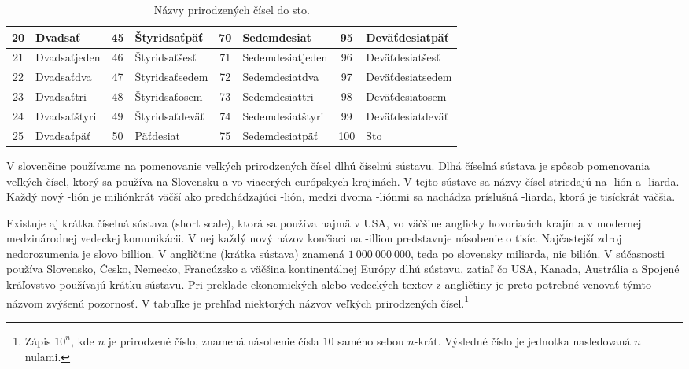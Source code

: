 \documentclass{report}
\begin{document}
\begin{table}[H]
\begin{tabular}{|cl|cl|cl|cl|}
    \hline
    20 & Dvadsať & 45 & Štyridsaťpäť & 70 & Sedemdesiat & 95 & Deväťdesiatpäť \\
    \hline
    21 & Dvadsaťjeden & 46 & Štyridsaťšesť & 71 & Sedemdesiatjeden & 96 & Deväťdesiatšesť \\
    \hline
    22 & Dvadsaťdva & 47 & Štyridsaťsedem & 72 & Sedemdesiatdva & 97 & Deväťdesiatsedem \\
    \hline
    23 & Dvadsaťtri & 48 & Štyridsaťosem & 73 & Sedemdesiattri & 98 & Deväťdesiatosem \\
    \hline
    24 & Dvadsaťštyri & 49 & Štyridsaťdeväť & 74 & Sedemdesiatštyri & 99 & Deväťdesiatdeväť \\
    \hline
    25 & Dvadsaťpäť & 50 & Päťdesiat & 75 & Sedemdesiatpäť & 100 & Sto \\
    \hline
  \end{tabular}
  \caption{Názvy prirodzených čísel do sto.}
\end{table}

V slovenčine používame na pomenovanie veľkých prirodzených čísel dlhú číselnú sústavu. Dlhá číselná sústava je spôsob pomenovania veľkých čísel, ktorý sa používa na Slovensku a vo viacerých európskych krajinách. V tejto sústave sa názvy čísel striedajú na -lión a -liarda. Každý nový -lión je miliónkrát väčší ako predchádzajúci -lión, medzi dvoma -liónmi sa nachádza príslušná -liarda, ktorá je tisíckrát väčšia.

Existuje aj krátka číselná sústava (short scale), ktorá sa používa najmä v USA, vo väčšine anglicky hovoriacich krajín a v modernej medzinárodnej vedeckej komunikácii. V nej každý nový názov končiaci na -illion predstavuje násobenie o tisíc. Najčastejší zdroj nedorozumenia je slovo billion. V angličtine (krátka sústava) znamená \(1\ 000\ 000\ 000\), teda po slovensky miliarda, nie bilión. V súčasnosti používa Slovensko, Česko, Nemecko, Francúzsko a väčšina kontinentálnej Európy dlhú sústavu, zatiaľ čo USA, Kanada, Austrália a Spojené kráľovstvo používajú krátku sústavu. Pri preklade ekonomických alebo vedeckých textov z angličtiny je preto potrebné venovať týmto názvom zvýšenú pozornosť. V tabuľke je prehľad niektorých názvov veľkých prirodzených čísel.\footnote{Zápis \(10^n\), kde \(n\) je prirodzené číslo, znamená násobenie čísla \(10\) samého sebou \(n\)-krát. Výsledné číslo je jednotka nasledovaná \(n\) nulami.}
\end{document}
